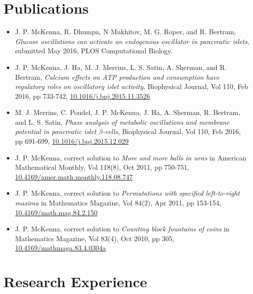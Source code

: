 \documentclass[11pt]{article}
\begin{document}
\section*{Publications}
\label{sec:orgheadline6}
\begin{itemize}
\item J. P. McKenna, R. Dhumpa, N Mukhitov, M. G. Roper, and R. Bertram, \emph{Glucose oscillations can activate an endogenous oscillator in pancreatic islets}, submitted May 2016, PLOS Computational Biology.\\
\item J. P. McKenna, J. Ha, M. J. Merrins, L. S. Satin, A. Sherman, and R. Bertram, \emph{Calcium effects on ATP production and consumption have regulatory roles on oscillatory islet activity}, Biophysical Journal, Vol 110, Feb 2016, pp 733-742, \href{http://dx.doi.org/10.1016/j.bpj.2015.11.3526}{10.1016/j.bpj.2015.11.3526}\\
\item M. J. Merrins, C. Poudel, J. P. McKenna, J. Ha, A. Sherman, R. Bertram, and L. S. Satin, \emph{Phase analysis of metabolic oscillations and membrane potential in pancreatic islet \(\beta\)-cells}, Biophysical Journal, Vol 110, Feb 2016, pp 691-699, \href{http://dx.doi.org/10.1016/j.bpj.2015.12.029}{10.1016/j.bpj.2015.12.029}\\
\item J. P. McKenna, correct solution to \emph{More and more balls in urns} in American Mathematical Monthly, Vol 118(8), Oct 2011, pp 750-751, \href{http://dx.doi.org/10.4169/amer.math.monthly.118.08.747}{10.4169/amer.math.monthly.118.08.747}\\
\item J. P. McKenna, correct solution to \emph{Permutations with specified left-to-right maxima} in Mathematics Magazine, Vol 84(2), Apr 2011, pp 153-154, \href{http://dx.doi.org/10.4169/math.mag.84.2.150}{10.4169/math.mag.84.2.150}\\
\item J. P. McKenna, correct solution to \emph{Counting block fountains of coins} in Mathematics Magazine, Vol 83(4), Oct 2010, pp 305, \href{http://www.jstor.org/stable/10.4169/mathmaga.83.4.0304a}{10.4169/mathmaga.83.4.0304a}\\
\end{itemize}
\section*{Research Experience}
\label{sec:orgheadline10}
\end{document}
